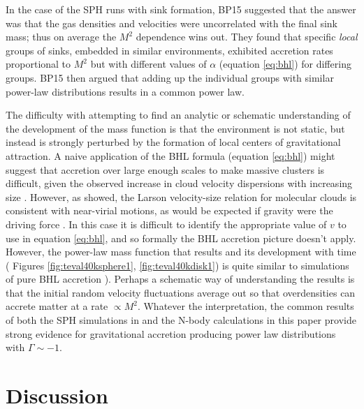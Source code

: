 \documentclass[iop]{emulateapj}
\begin{document}
In the case of the SPH runs with sink formation,
BP15 suggested that the answer was that the
gas densities and velocities were uncorrelated
with the final sink mass; thus on average the
$M^2$ dependence wins out.  They found
that specific {\em local} groups of
sinks, embedded in similar environments, exhibited accretion rates proportional to $M^2$ but with
different values of $\alpha$ (equation \ref{eq:bhl}) for differing groups.  BP15 then argued that
adding up the individual groups
with similar power-law distributions results
in a common power law.


The difficulty with attempting to find an analytic or schematic
understanding of the development of the mass function
is that the environment is not static, but instead is
strongly perturbed by the formation of local centers
of gravitational attraction.  A naive application of the
BHL formula (equation \ref{eq:bhl}) might suggest
that accretion over large enough scales to make massive
clusters is difficult, given the observed increase in
cloud velocity dispersions with increasing size \citep{larson81}.
However, as \citet{heyer09} showed, the Larson velocity-size relation for
molecular clouds is consistent with near-virial motions, as would be expected if gravity were the driving force \citep[see also][]{bp11}.  In this case it is difficult to identify the appropriate value of $v$ to use
in equation \ref{eq:bhl}, and so
formally the BHL accretion picture doesn't apply.  However, the power-law mass function that results and its development with time ( Figures \ref{fig:teval40ksphere1}, \ref{fig:teval40kdisk1}) is quite similar to simulations of pure BHL accretion
\citep[see, e.g., Figure 10 in][]{hsu10}).  Perhaps a schematic way of understanding the results is
that the initial random
velocity fluctuations average out
so that overdensities can accrete
matter at a rate $\propto M^2$.
Whatever the interpretation, the
common results of both the SPH
simulations in \citet{ballesteros15} and the
N-body calculations in this paper
provide strong evidence for
gravitational accretion producing
power law distributions with
$\Gamma \sim -1$.


\section{Discussion}
\end{document}
